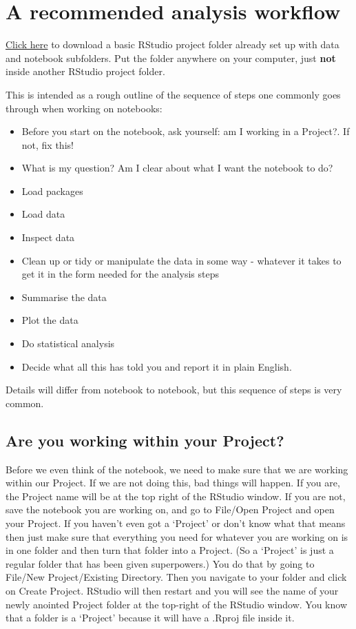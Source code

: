 \documentclass[
  letterpaper,
  DIV=11,
  numbers=noendperiod]{scrreprt}
\providecommand{\tightlist}{%
  \setlength{\itemsep}{0pt}\setlength{\parskip}{0pt}}\usepackage{longtable,booktabs,array}
\begin{document}
\chapter{A recommended analysis
workflow}\label{a-recommended-analysis-workflow}

\vspace{-10mm}

\href{https://github.com/mbh038/My_project_folder/archive/refs/heads/main.zip}{Click
here} to download a basic RStudio project folder already set up with
data and notebook subfolders. Put the folder anywhere on your computer,
just \textbf{not} inside another RStudio project folder.

This is intended as a rough outline of the sequence of steps one
commonly goes through when working on notebooks:

\begin{itemize}
\tightlist
\item
  Before you start on the notebook, ask yourself: am I working in a
  Project?. If not, fix this!
\item
  What is my question? Am I clear about what I want the notebook to do?
\item
  Load packages
\item
  Load data
\item
  Inspect data
\item
  Clean up or tidy or manipulate the data in some way - whatever it
  takes to get it in the form needed for the analysis steps
\item
  Summarise the data
\item
  Plot the data
\item
  Do statistical analysis
\item
  Decide what all this has told you and report it in plain English.
\end{itemize}

Details will differ from notebook to notebook, but this sequence of
steps is very common.

\section{Are you working within your
Project?}\label{are-you-working-within-your-project}

Before we even think of the notebook, we need to make sure that we are
working within our Project. If we are not doing this, bad things will
happen. If you are, the Project name will be at the top right of the
RStudio window. If you are not, save the notebook you are working on,
and go to File/Open Project and open your Project. If you haven't even
got a `Project' or don't know what that means then just make sure that
everything you need for whatever you are working on is in one folder and
then turn that folder into a Project. (So a `Project' is just a regular
folder that has been given superpowers.) You do that by going to
File/New Project/Existing Directory. Then you navigate to your folder
and click on Create Project. RStudio will then restart and you will see
the name of your newly anointed Project folder at the top-right of the
RStudio window. You know that a folder is a `Project' because it will
have a .Rproj file inside it.
\end{document}
